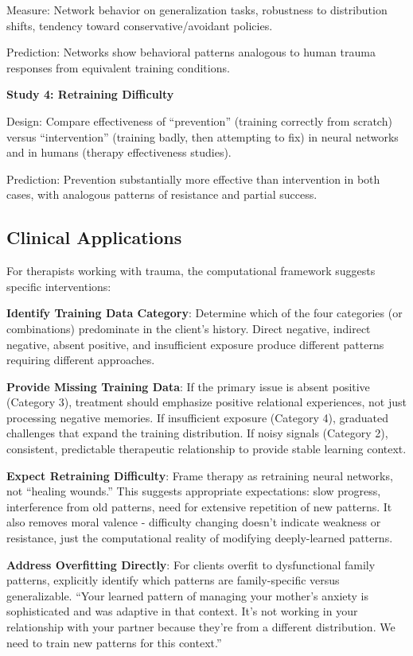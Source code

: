 \documentclass{article}
\begin{document}
Measure: Network behavior on generalization tasks, robustness to distribution shifts, tendency toward conservative/avoidant policies.

Prediction: Networks show behavioral patterns analogous to human trauma responses from equivalent training conditions.

\textbf{Study 4: Retraining Difficulty}

Design: Compare effectiveness of ``prevention'' (training correctly from scratch) versus ``intervention'' (training badly, then attempting to fix) in neural networks and in humans (therapy effectiveness studies).

Prediction: Prevention substantially more effective than intervention in both cases, with analogous patterns of resistance and partial success.

\subsection{Clinical Applications}

For therapists working with trauma, the computational framework suggests specific interventions:

\textbf{Identify Training Data Category}: Determine which of the four categories (or combinations) predominate in the client's history. Direct negative, indirect negative, absent positive, and insufficient exposure produce different patterns requiring different approaches.

\textbf{Provide Missing Training Data}: If the primary issue is absent positive (Category 3), treatment should emphasize positive relational experiences, not just processing negative memories. If insufficient exposure (Category 4), graduated challenges that expand the training distribution. If noisy signals (Category 2), consistent, predictable therapeutic relationship to provide stable learning context.

\textbf{Expect Retraining Difficulty}: Frame therapy as retraining neural networks, not ``healing wounds.'' This suggests appropriate expectations: slow progress, interference from old patterns, need for extensive repetition of new patterns. It also removes moral valence - difficulty changing doesn't indicate weakness or resistance, just the computational reality of modifying deeply-learned patterns.

\textbf{Address Overfitting Directly}: For clients overfit to dysfunctional family patterns, explicitly identify which patterns are family-specific versus generalizable. ``Your learned pattern of managing your mother's anxiety is sophisticated and was adaptive in that context. It's not working in your relationship with your partner because they're from a different distribution. We need to train new patterns for this context.''
\end{document}
